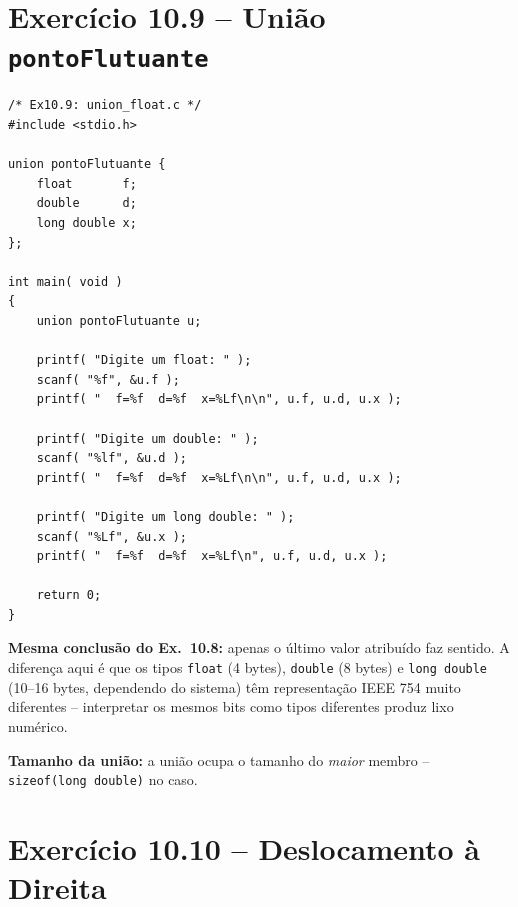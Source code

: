 \documentclass[12pt,a4paper]{article}
\begin{document}
\newpage

\section{Exercício 10.9 -- União \texttt{pontoFlutuante}}

\begin{respostabox}
\begin{lstlisting}
/* Ex10.9: union_float.c */
#include <stdio.h>

union pontoFlutuante {
    float       f;
    double      d;
    long double x;
};

int main( void )
{
    union pontoFlutuante u;

    printf( "Digite um float: " );
    scanf( "%f", &u.f );
    printf( "  f=%f  d=%f  x=%Lf\n\n", u.f, u.d, u.x );

    printf( "Digite um double: " );
    scanf( "%lf", &u.d );
    printf( "  f=%f  d=%f  x=%Lf\n\n", u.f, u.d, u.x );

    printf( "Digite um long double: " );
    scanf( "%Lf", &u.x );
    printf( "  f=%f  d=%f  x=%Lf\n", u.f, u.d, u.x );

    return 0;
}
\end{lstlisting}

\textbf{Mesma conclusão do Ex.~10.8:} apenas o último valor atribuído faz sentido.
A diferença aqui é que os tipos \texttt{float} (4 bytes), \texttt{double} (8 bytes)
e \texttt{long double} (10--16 bytes, dependendo do sistema) têm representação
IEEE 754 muito diferentes -- interpretar os mesmos bits como tipos diferentes
produz lixo numérico.

\textbf{Tamanho da união:} a união ocupa o tamanho do \textit{maior} membro --
\texttt{sizeof(long double)} no caso.
\end{respostabox}

\section{Exercício 10.10 -- Deslocamento à Direita}
\end{document}
